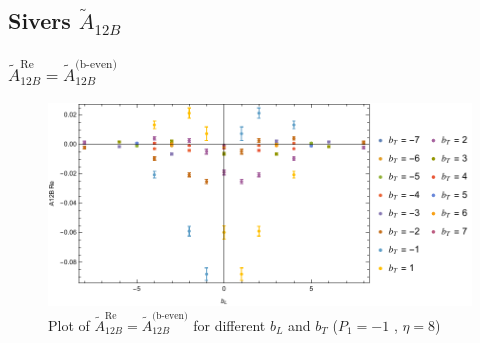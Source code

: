 \documentclass[]{article}
\numberwithin{equation}{section}
\newcommand{\tAmp}{\widetilde{A}}
\newcommand{\tAmp}{\ensuremath{\widetilde{A}^{(+)}}}
\begin{document}
\subsection{Sivers $\tAmp_{12B}$}
\subsubsection{$\tAmp^{\text{Re}}_{12B}=\tAmp^{\text{(b-even)}}_{12B}$}
\begin{figure}[h!]
    \centering
    \includegraphics[width=0.45\linewidth]{bLbT_A12B_b_even_P1_-1_eta_8a.pdf}
    \caption{Plot of  $\tAmp^{\text{Re}}_{12B}=\tAmp^{\text{(b-even)}}_{12B}$ for different $b_{L}$ and $b_{T}$  ($P_{1} = -1$ , $\eta=8$)}
\end{figure}
\end{document}
